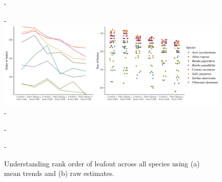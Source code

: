 \documentclass{article}\usepackage[]{graphicx}\usepackage[]{color}
\begin{document}
{\begin{figure} [H]
  -\begin{center}
  -\includegraphics[width=18cm]{..//analyses/figures/budset_orderandraw.png} 
  -\caption{Understanding rank order of leafout across all species using (a) mean trends and (b) raw estimates. }\label{fig:bsetrank}
  -\end{center}
  -\end{figure}}
\end{document}
